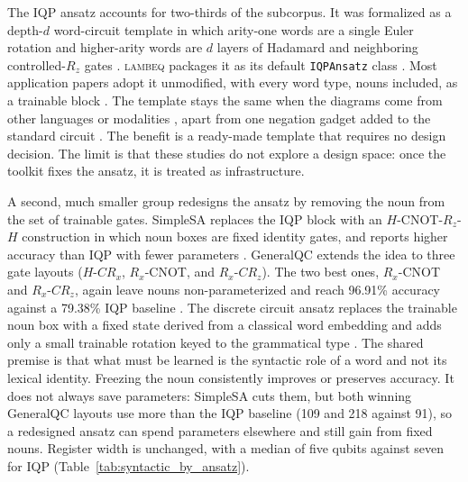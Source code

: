 \documentclass{ieeeaccess}
\begin{document}
The IQP ansatz accounts for two-thirds of the subcorpus. It was formalized as a depth-$d$ word-circuit template in which arity-one words are a single Euler rotation and higher-arity words are $d$ layers of Hadamard and neighboring controlled-$R_z$ gates \cite{meichanetzidis_quantum_2021,meichanetzidis_grammar-aware_2023,lorenz_qnlp_2023}. \textsc{lambeq} packages it as its default \texttt{IQPAnsatz} class \cite{kartsaklis_lambeq_2021}.
Most application papers adopt it unmodified, with every word type, nouns included, as a trainable block \cite{r_quantum_2023,hawashin_compositional_2025,bharti_quantum_2025,ganguly_quantum_2022,naik_extending_2026,sun_quantum_2026,rajashekharaiah_sentence_2023,ruskanda_enhancing_2024,bouakba_ensemble_2023,wazni_quantum_2022,wazni_large_2024}. The template stays the same when the diagrams come from other languages or modalities \cite{balthasar_mansky_adapting_2023,abbaszadeh_hybrid_2026,miranda_quantum_2022}, apart from one negation gadget added to the standard circuit \cite{ruskanda_quantum_2022}.
The benefit is a ready-made template that requires no design decision. The limit is that these studies do not explore a design space: once the toolkit fixes the ansatz, it is treated as infrastructure.

A second, much smaller group redesigns the ansatz by removing the noun from the set of trainable gates.
SimpleSA replaces the IQP block with an $H$-CNOT-$R_z$-$H$ construction in which noun boxes are fixed identity gates, and reports higher accuracy than IQP with fewer parameters \cite{ruskanda_simple_2023}. GeneralQC extends the idea to three gate layouts ($H$-$CR_x$, $R_x$-CNOT, and $R_x$-$CR_z$). The two best ones, $R_x$-CNOT and $R_x$-$CR_z$, again leave nouns non-parameterized and reach 96.91\% accuracy against a 79.38\% IQP baseline \cite{abiwardani_generalized_2025}. The discrete circuit ansatz replaces the trainable noun box with a fixed state derived from a classical word embedding and adds only a small trainable rotation keyed to the grammatical type \cite{bhatuse_resolving_2025}. The shared premise is that what must be learned is the syntactic role of a word and not its lexical identity.
Freezing the noun consistently improves or preserves accuracy. It does not always save parameters: SimpleSA cuts them, but both winning GeneralQC layouts use more than the IQP baseline (109 and 218 against 91), so a redesigned ansatz can spend parameters elsewhere and still gain from fixed nouns. Register width is unchanged, with a median of five qubits against seven for IQP (Table~\ref{tab:syntactic_by_ansatz}).
\end{document}
